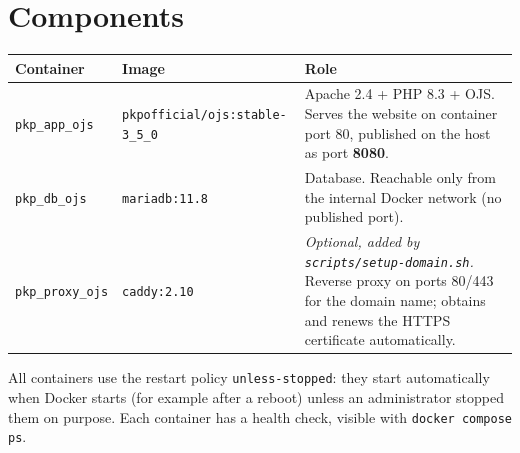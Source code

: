 \documentclass[11pt,a4paper]{report}
\newcommand{\code}[1]{\texttt{\small #1}}
\newcommand{\file}[1]{\texttt{\small #1}}
\begin{document}
\section{Components}
\begin{tabularx}{\linewidth}{@{}P{3.2cm}P{4.2cm}L@{}}
\toprule
\textbf{Container} & \textbf{Image} & \textbf{Role} \\
\midrule
\code{pkp\_app\_ojs}   & \code{pkpofficial/ojs:\allowbreak stable-3\_5\_0} & Apache 2.4 + PHP 8.3 + OJS. Serves the website on container port 80, published on the host as port \textbf{8080}. \\
\code{pkp\_db\_ojs}    & \code{mariadb:11.8} & Database. Reachable only from the internal Docker network (no published port). \\
\code{pkp\_proxy\_ojs} & \code{caddy:2.10} & \textit{Optional, added by \file{scripts/setup-domain.sh}.} Reverse proxy on ports 80/443 for the domain name; obtains and renews the HTTPS certificate automatically. \\
\bottomrule
\end{tabularx}

All containers use the restart policy \code{unless-stopped}: they start automatically when
Docker starts (for example after a reboot) unless an administrator stopped them on purpose.
Each container has a health check, visible with \code{docker compose ps}.
\end{document}
